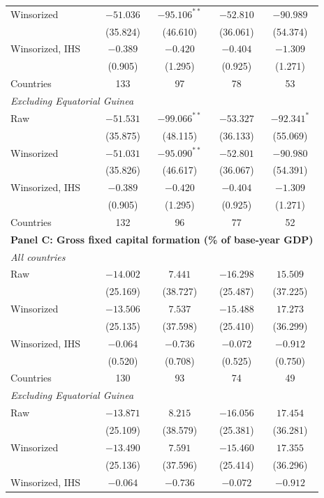 \begin{table}[htbp]
\begin{tabular}{lcccc}
Winsorized & $-51.036$ & $-95.106^{**}$ & $-52.810$ & $-90.989$ \\
 & (35.824) & (46.610) & (36.061) & (54.374) \\
Winsorized, IHS & $-0.389$ & $-0.420$ & $-0.404$ & $-1.309$ \\
 & (0.905) & (1.295) & (0.925) & (1.271) \\
Countries & 133 & 97 & 78 & 53 \\
\multicolumn{5}{l}{\textit{Excluding Equatorial Guinea}} \\
Raw & $-51.531$ & $-99.066^{**}$ & $-53.327$ & $-92.341^{*}$ \\
 & (35.875) & (48.115) & (36.133) & (55.069) \\
Winsorized & $-51.031$ & $-95.090^{**}$ & $-52.801$ & $-90.980$ \\
 & (35.826) & (46.617) & (36.067) & (54.391) \\
Winsorized, IHS & $-0.389$ & $-0.420$ & $-0.404$ & $-1.309$ \\
 & (0.905) & (1.295) & (0.925) & (1.271) \\
Countries & 132 & 96 & 77 & 52 \\
\midrule
\multicolumn{5}{l}{\textbf{Panel C: Gross fixed capital formation (\% of base-year GDP)}} \\
\multicolumn{5}{l}{\textit{All countries}} \\
Raw & $-14.002$ & $7.441$ & $-16.298$ & $15.509$ \\
 & (25.169) & (38.727) & (25.487) & (37.225) \\
Winsorized & $-13.506$ & $7.537$ & $-15.488$ & $17.273$ \\
 & (25.135) & (37.598) & (25.410) & (36.299) \\
Winsorized, IHS & $-0.064$ & $-0.736$ & $-0.072$ & $-0.912$ \\
 & (0.520) & (0.708) & (0.525) & (0.750) \\
Countries & 130 & 93 & 74 & 49 \\
\multicolumn{5}{l}{\textit{Excluding Equatorial Guinea}} \\
Raw & $-13.871$ & $8.215$ & $-16.056$ & $17.454$ \\
 & (25.109) & (38.579) & (25.381) & (36.281) \\
Winsorized & $-13.490$ & $7.591$ & $-15.460$ & $17.355$ \\
 & (25.136) & (37.596) & (25.414) & (36.296) \\
Winsorized, IHS & $-0.064$ & $-0.736$ & $-0.072$ & $-0.912$ \\

\end{tabular}
\end{table}

